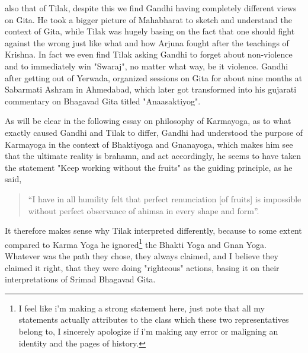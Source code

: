 \documentclass[a4paper]{article}
\begin{document}
also that of Tilak, despite this we find Gandhi having completely different views on Gita. He took a bigger picture of Mahabharat to
sketch and understand the context of Gita, while Tilak was hugely basing on the fact that one should fight against the wrong just like
what and how Arjuna fought after the teachings of Krishna. In fact we even find Tilak asking Gandhi to forget about
non-violence and to immediately win "Swaraj", no matter what way, be it violence. Gandhi after getting out of Yerwada, organized sessions on Gita for about nine months at
Sabarmati Ashram in Ahmedabad, which later got transformed into his gujarati commentary on Bhagavad Gita titled "Anaasaktiyog". 

As will be clear in the following essay on philosophy of Karmayoga, as to what exactly caused Gandhi and Tilak to differ, Gandhi had understood the 
purpose of Karmayoga in the context of Bhaktiyoga and Gnanayoga, which makes him see that the ultimate reality is brahamn, and act accordingly,
he seems to have taken the statement "Keep working without the  fruits" as the guiding principle, as he said, 
\begin{quote}
    “I have in all humility felt that perfect renunciation [of fruits] is impossible without perfect observance of ahimsa in every shape and form”.
\end{quote}
It therefore makes sense why Tilak interpreted differently, because to some extent compared to Karma Yoga he ignored\footnote{I feel
like i'm making a strong statement here, just note that all my statements actually attributes to the class which these two representatives 
belong to, I sincerely apologize if i'm making any error or maligning an identity and the pages of history.} 
the Bhakti Yoga and Gnan Yoga. Whatever was the path they chose, they always claimed, and I believe they claimed it right, 
that they were doing "righteous" actions, basing it on their interpretations of Srimad Bhagavad Gita. 
\end{document}
